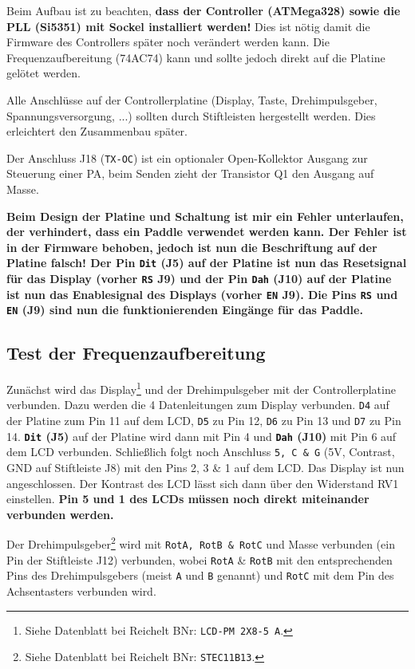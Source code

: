 \documentclass[10pt, a4paper]{paper}
\newcommand{\warn}[1]{\textbf{#1}}
\newcommand{\con}[1]{\texttt{#1}}
\begin{document}
Beim Aufbau ist zu beachten, \warn{dass der Controller (ATMega328) sowie die PLL (Si5351) mit Sockel installiert werden!} Dies ist nötig damit die Firmware des Controllers später noch verändert werden kann. Die Frequenzaufbereitung (74AC74) kann und sollte jedoch direkt auf die Platine gelötet werden. 

Alle Anschlüsse auf der Controllerplatine (Display, Taste, Drehimpulsgeber, Spannungsversorgung, ...) sollten durch Stiftleisten hergestellt werden. Dies erleichtert den Zusammenbau später.

Der Anschluss J18 (\con{TX-OC}) ist ein optionaler Open-Kollektor Ausgang zur Steuerung einer PA, beim Senden zieht der Transistor Q1 den Ausgang auf Masse.

\warn{Beim Design der Platine und Schaltung ist mir ein Fehler unterlaufen, der verhindert, dass ein Paddle verwendet werden kann. Der Fehler ist in der Firmware behoben, jedoch ist nun die Beschriftung auf der Platine falsch! Der Pin \con{Dit} (J5) auf der Platine ist nun das Resetsignal für das Display (vorher \con{RS} J9) und der Pin \con{Dah} (J10) auf der Platine ist nun das Enablesignal des Displays (vorher \con{EN} J9). Die Pins \con{RS} und \con{EN} (J9) sind nun die funktionierenden Eingänge für das Paddle.}  

\subsection{Test der Frequenzaufbereitung}
Zunächst wird das Display\footnote{Siehe Datenblatt bei Reichelt BNr: \texttt{LCD-PM 2X8-5 A}.} und der Drehimpulsgeber mit der Controllerplatine verbunden. Dazu werden die 4 Datenleitungen zum Display verbunden. \con{D4} auf der Platine zum Pin 11 auf dem LCD, \con{D5} zu Pin 12, \con{D6} zu Pin 13 und \con{D7} zu Pin 14. \warn{\con{Dit} (J5)} auf der Platine wird dann mit Pin 4 und \warn{\con{Dah} (J10)} mit Pin 6 auf dem LCD verbunden. Schließlich folgt noch Anschluss \con{5, C \& G} (5V, Contrast, GND auf Stiftleiste J8) mit den Pins 2, 3 \& 1 auf dem LCD. Das Display ist nun angeschlossen. Der Kontrast des LCD lässt sich dann über den Widerstand RV1 einstellen. \warn{Pin 5 und 1 des LCDs müssen noch direkt miteinander verbunden werden.}

Der Drehimpulsgeber\footnote{Siehe Datenblatt bei Reichelt BNr: \texttt{STEC11B13}.} wird mit \con{RotA, RotB \& RotC} und Masse verbunden (ein Pin der Stiftleiste J12) verbunden, wobei \con{RotA} \& \con{RotB} mit den entsprechenden Pins des Drehimpulsgebers (meist \con{A} und \con{B} genannt) und \con{RotC} mit dem Pin des Achsentasters verbunden wird. 
\end{document}
